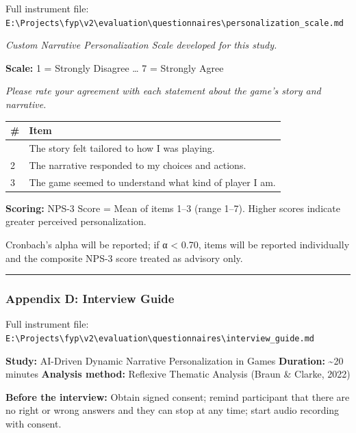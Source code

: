Full instrument file:
\texttt{E:\textbackslash{}Projects\textbackslash{}fyp\textbackslash{}v2\textbackslash{}evaluation\textbackslash{}questionnaires\textbackslash{}personalization\_scale.md}

\emph{Custom Narrative Personalization Scale developed for this study.}

\textbf{Scale:} 1 = Strongly Disagree \ldots{} 7 = Strongly Agree

\emph{Please rate your agreement with each statement about the game's
story and narrative.}

\begin{longtable}[]{@{}ll@{}}
\toprule\noalign{}
\# & Item \\
\midrule\noalign{}
\endhead
\bottomrule\noalign{}
\endlastfoot
1 & The story felt tailored to how I was playing. \\
2 & The narrative responded to my choices and actions. \\
3 & The game seemed to understand what kind of player I am. \\
\end{longtable}

\textbf{Scoring:} NPS-3 Score = Mean of items 1--3 (range 1--7). Higher
scores indicate greater perceived personalization.

Cronbach's alpha will be reported; if α \textless{} 0.70, items will be
reported individually and the composite NPS-3 score treated as advisory
only.

\begin{center}\rule{0.5\linewidth}{0.5pt}\end{center}

\subsubsection{Appendix D: Interview
Guide}\label{appendix-d-interview-guide}

Full instrument file:
\texttt{E:\textbackslash{}Projects\textbackslash{}fyp\textbackslash{}v2\textbackslash{}evaluation\textbackslash{}questionnaires\textbackslash{}interview\_guide.md}

\textbf{Study:} AI-Driven Dynamic Narrative Personalization in Games
\textbf{Duration:} \textasciitilde20 minutes \textbf{Analysis method:}
Reflexive Thematic Analysis (Braun \& Clarke, 2022)

\textbf{Before the interview:} Obtain signed consent; remind participant
that there are no right or wrong answers and they can stop at any time;
start audio recording with consent.

